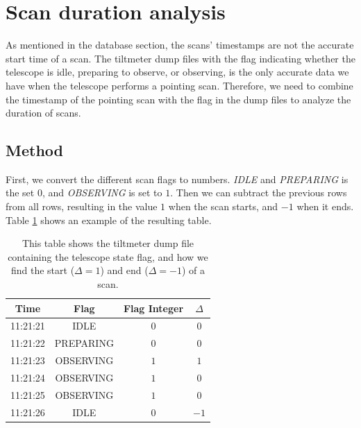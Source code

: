
\section{Scan duration analysis}
As mentioned in the database section, the scans' timestamps are not the accurate start time of a scan.
The tiltmeter dump files with the flag indicating whether the telescope is idle, preparing to observe, or observing,
is the only accurate data we have when the telescope performs a pointing scan.
Therefore, we need to combine the timestamp of the pointing scan with the flag in the dump files to analyze the duration of scans.

\subsection{Method}
First, we convert the different scan flags to numbers.
\textit{IDLE} and \textit{PREPARING} is the set $0$, and \textit{OBSERVING} is set to $1$.
Then we can subtract the previous rows from all rows, resulting in the value $1$ when the scan starts, and $-1$ when it ends.
Table \ref{tab:scan_flag_difference} shows an example of the resulting table.


\begin{table}[H]
    \centering
    \begin{tabular}{cccc}
        \toprule
        Time & Flag & Flag Integer & $\Delta$ \\
        \midrule
        11:21:21 & IDLE & $0$ & $0$ \\
        11:21:22 & PREPARING & $0$ & $0$ \\
        11:21:23 & OBSERVING & $1$ & $1$ \\
        11:21:24 & OBSERVING & $1$ & $0$ \\
        11:21:25 & OBSERVING & $1$ & $0$ \\
        11:21:26 & IDLE & $0$ & $-1$ \\
        \bottomrule
    \end{tabular}
    \caption{This table shows the tiltmeter dump file containing the telescope state flag,
            and how we find the start ($\Delta = 1$) and end ($\Delta = -1$) of a scan.}
    \label{tab:scan_flag_difference}
\end{table}

